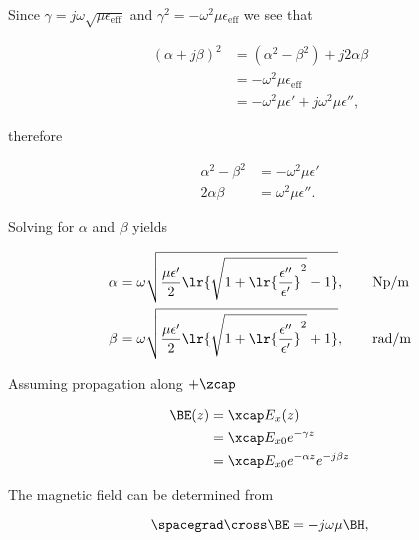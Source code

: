 Since \( \gamma = j \omega \sqrt{ \mu \epsilon_{\mathrm{eff}} } \) and \( \gamma^2 = -\omega^2 \mu \epsilon_{\mathrm{eff}} \) we see that

\begin{equation}\label{eqn:uwavesLecture3:120}
\begin{aligned}
(\alpha + j \beta)^2
&= (\alpha^2 - \beta^2) + j 2 \alpha \beta
\\ &= - \omega^2 \mu \epsilon_{\mathrm{eff}}
\\ &= - \omega^2 \mu \epsilon'
  + j \omega^2 \mu \epsilon'',
\end{aligned}
\end{equation}

therefore

\begin{equation}\label{eqn:uwavesLecture3:140}
\begin{aligned}
\alpha^2 - \beta^2 &= - \omega^2 \mu \epsilon' \\
2 \alpha \beta &= \omega^2 \mu \epsilon''.
\end{aligned}
\end{equation}

Solving for \( \alpha \) and \( \beta \) yields

\begin{equation}\label{eqn:uwavesLecture3:160}
\begin{aligned}
\alpha &= \omega \sqrt{ \frac{\mu \epsilon'}{2} \lr{ \sqrt{ 1 + \lr{\frac{\epsilon''}{\epsilon'}}^2 } - 1 } }, \qquad \si{Np/m}  \\
\beta &= \omega \sqrt{ \frac{\mu \epsilon'}{2} \lr{ \sqrt{ 1 + \lr{\frac{\epsilon''}{\epsilon'}}^2 } + 1 } } , \qquad \si{rad/m} \\
\end{aligned}
\end{equation}

Assuming propagation along \( + \zcap \)

\begin{equation}\label{eqn:uwavesLecture3:180}
\begin{aligned}
\BE(z)
&= \xcap E_x(z)
\\ &= \xcap E_{x0} e^{-\gamma z}
\\ &= \xcap E_{x0} e^{-\alpha z} e^{-j \beta z}
\end{aligned}
\end{equation}

The magnetic field can be determined from

\begin{equation}\label{eqn:uwavesLecture3:200}
\spacegrad \cross \BE = - j \omega \mu \BH,
\end{equation}

